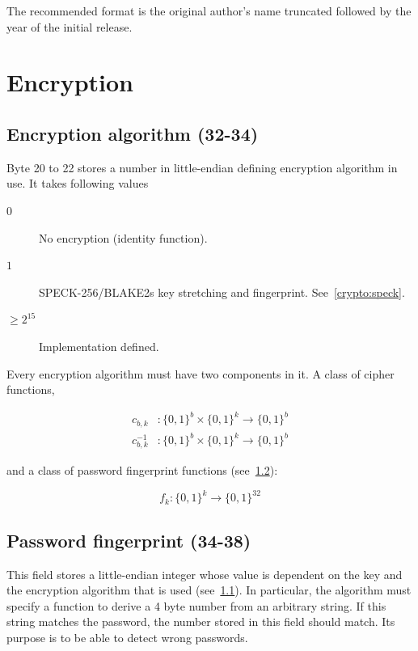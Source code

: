 \documentclass[11pt,a4paper]{report}
\begin{document}
        The recommended format is the original author's name truncated
        followed by the year of the initial release.

    \section{Encryption}
        \subsection{Encryption algorithm (32-34)}
        \label{header:encryption}
        Byte 20 to 22 stores a number in little-endian defining encryption
        algorithm in use. It takes following values

        \begin{description}
            \item [$0$] No encryption (identity function).
            \item [$1$] SPECK-256/BLAKE2s key stretching and fingerprint.
                See~\ref{crypto:speck}.
            \item [$\geq 2^{15}$] Implementation defined.
        \end{description}

        Every encryption algorithm must have two components in it. A class of
        cipher functions,

        \begin{align*}
            c_{b, k}      &: \{0, 1\}^b \times \{0, 1\}^k \to \{0, 1\}^b \\
            c_{b, k}^{-1} &: \{0, 1\}^b \times \{0, 1\}^k \to \{0, 1\}^b
        \end{align*}

        and a class of password fingerprint functions (see~\ref{header:fingerprint}):

        $$f_k : \{0,1\}^k \to \{0,1\}^{32}$$

        \subsection{Password fingerprint (34-38)}
        \label{header:fingerprint}
        This field stores a little-endian integer whose value is dependent on
        the key and the encryption algorithm that is used
        (see~\ref{header:encryption}). In particular, the algorithm must
        specify a function to derive a 4 byte number from an arbitrary string.
        If this string matches the password, the number stored in this field
        should match. Its purpose is to be able to detect wrong passwords.
\end{document}
